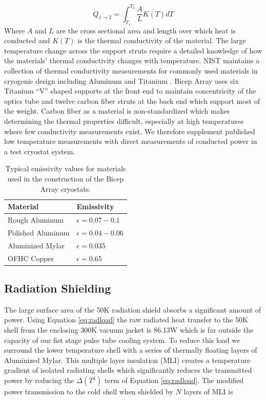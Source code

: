 \documentclass[12pt]{article}
\begin{document}
\begin{equation}
	\dot{Q}_{1\rightarrow 2}=\int _{T_1} ^{T_2} \frac{A}{L}K(T)dT
	\label{eq:conduction}
\end{equation}
Where $A$ and $L$ are the cross sectional area and length over which heat is
conducted and $K(T)$ is the thermal conductivity of the material. The large
temperature change across the support struts require a detailed knowledge of
how the materials' thermal conductivity changes with temperature.  NIST
maintains a collection of thermal conductivity measurements for commonly used
materials in cryogenic design including Aluminum and Titanium \cite{cite:NIST}. Bicep Array
uses six Titanium ``V'' shaped supports at the front end to maintain
concentricity of the  optics tube and twelve carbon fiber struts at the back end which support most of the
weight. Carbon fiber as a material is non-standardized which makes determining
the thermal properties difficult, especially at high temperatures where few
conductivity measurements exist. We therefore supplement published low
temperature measurements with direct measurements of conducted power in a test
cryostat system.
\begin{table}
	\center
\begin{tabular}{|l|l|}
	\hline
	\textbf{Material} & \textbf{Emissivity} \\
	\hline \hline
	Rough Aluminum & $\epsilon = 0.07-0.1$ \\
	Polished Aluminum & $\epsilon = 0.04 - 0.06$ \\
	Aluminized Mylar & $\epsilon = 0.035$ \\
	OFHC Copper & $\epsilon = 0.65$ \\ \hline
\end{tabular}
	\caption{Typical emissivity values for materials used in the construction
	of the Bicep Array cryostats.}
	\label{table:emis}
\end{table}



\subsection{Radiation Shielding}
The large surface area of the 50K radiation shield absorbs a significant
amount of power. Using Equation \ref{eq:radload} the raw radiated heat
transfer to the 50K shell from the enclosing 300K vacuum jacket is 86.13W which
is far outside the capacity of our fist stage pulse tube cooling system. To
reduce this load we surround the lower temperature shell with a series of
thermally floating layers of Aluminized Mylar. This multiple layer insulation
(MLI) creates a temperature gradient of isolated radiating shells which
significantly reduces the transmitted power by reducing the $\Delta (T^4)$
term of Equation \ref{eq:radload}. The modified power transmission to the cold
shell when shielded by $N$ layers of MLI is
\end{document}
